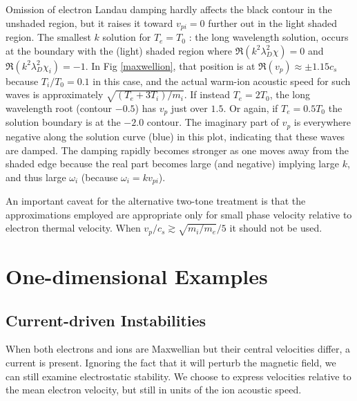 \documentclass[12pt]{article}
\begin{document}
Omission of electron Landau damping hardly affects the black contour
in the unshaded region, but it raises it toward $v_{pi}=0$ further out
in the light shaded region. The smallest $k$ solution for $T_e=T_0$ :
the long wavelength solution, occurs at the boundary with the (light)
shaded region where $\Re (k^2\lambda_{D}^2 \chi)= 0$ and
$\Re (k^2\lambda_{D}^2 \chi_i)= -1$.  In Fig \ref{maxwellion}, that
position is at $\Re (v_p)\approx\pm 1.15 c_{s}$ because $T_i/T_0=0.1$
in this case, and the actual warm-ion acoustic speed for such waves is
approximately $\sqrt{(T_e+3T_i)/m_i}$. If instead $T_e=2T_0$, the long
wavelength root (contour $-0.5$) has $v_p$ just over $1.5$. Or again,
if $T_e=0.5T_0$ the solution boundary is at the $-2.0$ contour.  The
imaginary part of $v_p$ is everywhere negative along the solution
curve (blue) in this plot, indicating that these waves are damped. The
damping rapidly becomes stronger as one moves away from the shaded
edge because the real part becomes large (and negative) implying large
$k$, and thus large $\omega_i$ (because $\omega_i =kv_{pi}$).

An important caveat for the alternative two-tone treatment is that the
approximations employed are appropriate only for small phase velocity
relative to electron thermal velocity. When $v_p/c_s\gtrsim
\sqrt{m_i/m_e}/5$ it should not be used. 

\section{One-dimensional Examples}
\subsection{Current-driven Instabilities}

When both electrons and ions are Maxwellian but their central
velocities differ, a current is present. Ignoring the fact that it
will perturb the magnetic field, we can still examine electrostatic
stability. We choose to express velocities relative to the mean
electron velocity, but still in units of the ion acoustic speed. 
\end{document}
